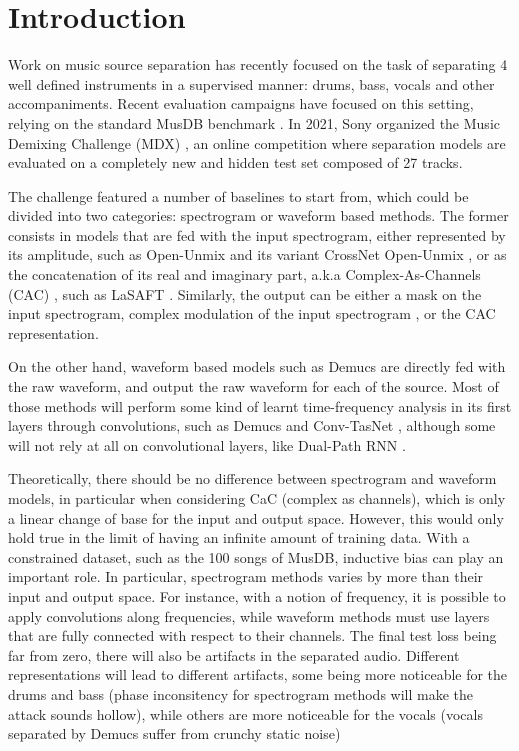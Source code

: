 \documentclass[10pt,a4paper,onecolumn]{article}
\begin{document}
\hypertarget{introduction}{%
\section{Introduction}\label{introduction}}

Work on music source separation has recently focused on the task of
separating 4 well defined instruments in a supervised manner: drums,
bass, vocals and other accompaniments. Recent evaluation campaigns
\citep{sisec} have focused on this setting, relying on the standard
MusDB benchmark \citep{musdb}. In 2021, Sony organized the Music
Demixing Challenge (MDX) \citep{mdx}, an online competition where
separation models are evaluated on a completely new and hidden test set
composed of 27 tracks.

The challenge featured a number of baselines to start from, which could
be divided into two categories: spectrogram or waveform based methods.
The former consists in models that are fed with the input spectrogram,
either represented by its amplitude, such as Open-Unmix \citep{umx} and
its variant CrossNet Open-Unmix \citep{xumx}, or as the concatenation of
its real and imaginary part, a.k.a Complex-As-Channels (CAC)
\citep{cac}, such as LaSAFT \citep{lasaft}. Similarly, the output can be
either a mask on the input spectrogram, complex modulation of the input
spectrogram \citep{kong2021decoupling}, or the CAC representation.

On the other hand, waveform based models such as Demucs \citep{demucs}
are directly fed with the raw waveform, and output the raw waveform for
each of the source. Most of those methods will perform some kind of
learnt time-frequency analysis in its first layers through convolutions,
such as Demucs and Conv-TasNet \citep{convtasnet}, although some will
not rely at all on convolutional layers, like Dual-Path RNN
\citep{dual_path}.

Theoretically, there should be no difference between spectrogram and
waveform models, in particular when considering CaC (complex as
channels), which is only a linear change of base for the input and
output space. However, this would only hold true in the limit of having
an infinite amount of training data. With a constrained dataset, such as
the 100 songs of MusDB, inductive bias can play an important role. In
particular, spectrogram methods varies by more than their input and
output space. For instance, with a notion of frequency, it is possible
to apply convolutions along frequencies, while waveform methods must use
layers that are fully connected with respect to their channels. The
final test loss being far from zero, there will also be artifacts in the
separated audio. Different representations will lead to different
artifacts, some being more noticeable for the drums and bass (phase
inconsitency for spectrogram methods will make the attack sounds
hollow), while others are more noticeable for the vocals (vocals
separated by Demucs suffer from crunchy static noise)
\end{document}
